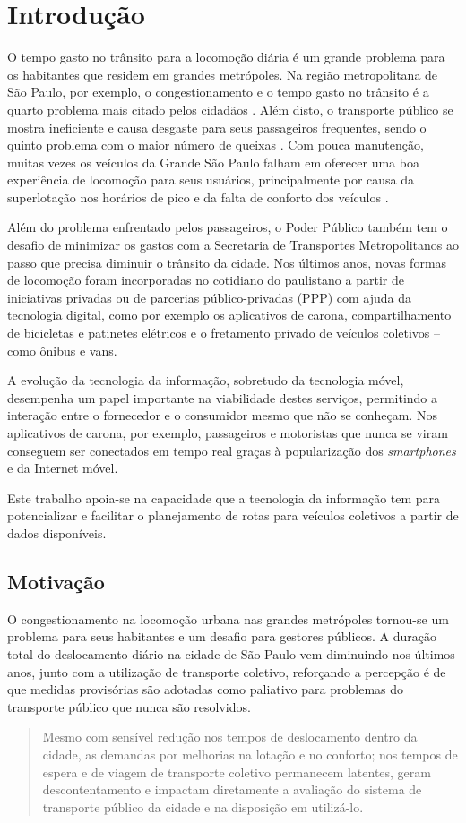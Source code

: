 \chapter{Introdução} 
O tempo gasto no trânsito para a locomoção diária é um grande problema para os habitantes que residem em grandes metrópoles. Na região metropolitana de São Paulo, por exemplo, o congestionamento e o tempo gasto no trânsito é a quarto problema mais citado pelos cidadãos \cite{viveremsp}. Além disto, o transporte público se mostra ineficiente e causa desgaste para seus passageiros frequentes, sendo o quinto problema com o maior número de queixas \cite{mobilize}. Com pouca manutenção, muitas vezes os veículos da Grande São Paulo falham em oferecer uma boa experiência de locomoção para seus usuários, principalmente por causa da superlotação nos horários de pico e da falta de conforto dos veículos \cite{viveremsp}.

Além do problema enfrentado pelos passageiros, o Poder Público também tem o desafio de minimizar os gastos com a Secretaria de Transportes Metropolitanos ao passo que precisa diminuir o trânsito da cidade. Nos últimos anos, novas formas de locomoção foram incorporadas no cotidiano do paulistano a partir de iniciativas privadas ou de parcerias público-privadas (PPP) com ajuda da tecnologia digital, como por exemplo os aplicativos de carona, compartilhamento de bicicletas e patinetes elétricos e o fretamento privado de veículos coletivos -- como ônibus e vans. 

A evolução da tecnologia da informação, sobretudo da tecnologia móvel, desempenha um papel importante na viabilidade destes serviços, permitindo a interação entre o fornecedor e o consumidor mesmo que não se conheçam. Nos aplicativos de carona, por exemplo, passageiros e motoristas que nunca se viram conseguem ser conectados em tempo real graças à popularização dos \emph{smartphones} e da Internet móvel. 

Este trabalho apoia-se na capacidade que a tecnologia da informação tem para potencializar e facilitar o planejamento de rotas para veículos coletivos a partir de dados disponíveis.

\section{Motivação}

O congestionamento na locomoção urbana nas grandes metrópoles tornou-se um problema para seus habitantes e um desafio para gestores públicos. A duração total do deslocamento diário na cidade de São Paulo vem diminuindo nos últimos anos, junto com a utilização de transporte coletivo, reforçando a percepção é de que medidas provisórias são adotadas como paliativo para problemas do transporte público que nunca são resolvidos.
\begin{quote}
Mesmo com sensível redução nos tempos de deslocamento dentro da cidade, as demandas por melhorias na lotação e no conforto; nos tempos de espera e de viagem de transporte coletivo permanecem latentes, geram descontentamento e impactam diretamente a avaliação do sistema de transporte público da cidade e na disposição em utilizá-lo.
\end{quote}

